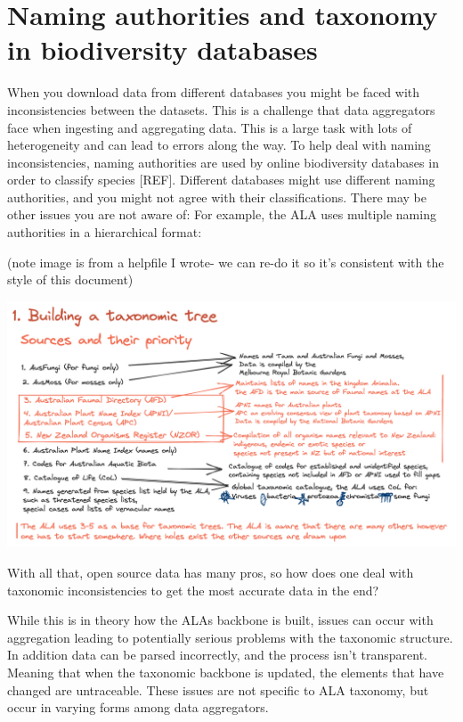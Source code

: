 \documentclass[
  letterpaper,
  DIV=11,
  numbers=noendperiod,
  oneside]{scrreprt}
\begin{document}
\hypertarget{naming-authorities-and-taxonomy-in-biodiversity-databases}{%
\section{Naming authorities and taxonomy in biodiversity
databases}\label{naming-authorities-and-taxonomy-in-biodiversity-databases}}

When you download data from different databases you might be faced with
inconsistencies between the datasets. This is a challenge that data
aggregators face when ingesting and aggregating data. This is a large
task with lots of heterogeneity and can lead to errors along the way. To
help deal with naming inconsistencies, naming authorities are used by
online biodiversity databases in order to classify species {[}REF{]}.
Different databases might use different naming authorities, and you
might not agree with their classifications. There may be other issues
you are not aware of: For example, the ALA uses multiple naming
authorities in a hierarchical format:

(note image is from a helpfile I wrote- we can re-do it so it's
consistent with the style of this document)

\includegraphics{images/image-1066364510.png}

With all that, open source data has many pros, so how does one deal with
taxonomic inconsistencies to get the most accurate data in the end?

While this is in theory how the ALAs backbone is built, issues can occur
with aggregation leading to potentially serious problems with the
taxonomic structure. In addition data can be parsed incorrectly, and the
process isn't transparent. Meaning that when the taxonomic backbone is
updated, the elements that have changed are untraceable. These issues
are not specific to ALA taxonomy, but occur in varying forms among data
aggregators.
\end{document}
